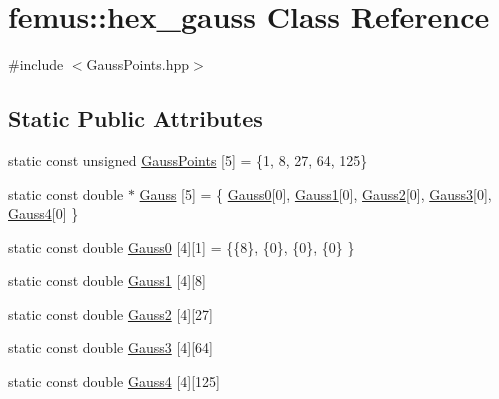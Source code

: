 \hypertarget{classfemus_1_1hex__gauss}{}\section{femus\+:\+:hex\+\_\+gauss Class Reference}
\label{classfemus_1_1hex__gauss}


{\ttfamily \#include $<$Gauss\+Points.\+hpp$>$}

\subsection*{Static Public Attributes}
\begin{DoxyCompactItemize}
\item 
static const unsigned \mbox{\hyperlink{classfemus_1_1hex__gauss_a807f55d8c0d8d6b6c916930262cf41fb}{Gauss\+Points}} \mbox{[}5\mbox{]} = \{1, 8, 27, 64, 125\}
\item 
static const double $\ast$ \mbox{\hyperlink{classfemus_1_1hex__gauss_a9bc16b5fd5ef1ac4cbe74704098055c2}{Gauss}} \mbox{[}5\mbox{]} = \{ \mbox{\hyperlink{classfemus_1_1hex__gauss_a3b4d247df74c3bd78282af5723c9a823}{Gauss0}}\mbox{[}0\mbox{]}, \mbox{\hyperlink{classfemus_1_1hex__gauss_add0c4c359244c52778f61ba3c250a361}{Gauss1}}\mbox{[}0\mbox{]}, \mbox{\hyperlink{classfemus_1_1hex__gauss_a9cb855ddaa9d2e95bebc34f0220abb4f}{Gauss2}}\mbox{[}0\mbox{]}, \mbox{\hyperlink{classfemus_1_1hex__gauss_a7b371e3076b486fc863ebf418cc75fec}{Gauss3}}\mbox{[}0\mbox{]}, \mbox{\hyperlink{classfemus_1_1hex__gauss_a831f1eea9fa85e31d69ca29de52f22c8}{Gauss4}}\mbox{[}0\mbox{]} \}
\item 
static const double \mbox{\hyperlink{classfemus_1_1hex__gauss_a3b4d247df74c3bd78282af5723c9a823}{Gauss0}} \mbox{[}4\mbox{]}\mbox{[}1\mbox{]} = \{\{8\}, \{0\}, \{0\}, \{0\} \}
\item 
static const double \mbox{\hyperlink{classfemus_1_1hex__gauss_add0c4c359244c52778f61ba3c250a361}{Gauss1}} \mbox{[}4\mbox{]}\mbox{[}8\mbox{]}
\item 
static const double \mbox{\hyperlink{classfemus_1_1hex__gauss_a9cb855ddaa9d2e95bebc34f0220abb4f}{Gauss2}} \mbox{[}4\mbox{]}\mbox{[}27\mbox{]}
\item 
static const double \mbox{\hyperlink{classfemus_1_1hex__gauss_a7b371e3076b486fc863ebf418cc75fec}{Gauss3}} \mbox{[}4\mbox{]}\mbox{[}64\mbox{]}
\item 
static const double \mbox{\hyperlink{classfemus_1_1hex__gauss_a831f1eea9fa85e31d69ca29de52f22c8}{Gauss4}} \mbox{[}4\mbox{]}\mbox{[}125\mbox{]}
\end{DoxyCompactItemize}


